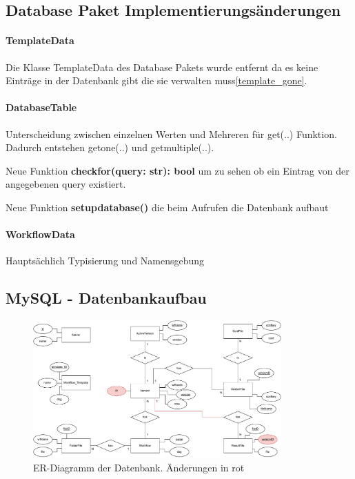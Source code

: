 \subsection{Database Paket Implementierungsänderungen}
\paragraph{TemplateData} Die Klasse TemplateData des Database Pakets wurde entfernt da es keine Einträge in der Datenbank gibt die sie verwalten muss\ref{template_gone}.


\paragraph{DatabaseTable} Unterscheidung zwischen einzelnen Werten und Mehreren für get(..) Funktion. Dadurch entstehen get\textunderscore one(..) und get\textunderscore multiple(..).

Neue Funktion \textbf{check\textunderscore for(query: str): bool} um zu sehen ob ein Eintrag von der angegebenen query existiert.

Neue Funktion \textbf{setup\textunderscore database()} die beim Aufrufen die Datenbank aufbaut

\paragraph{WorkflowData} Hauptsächlich Typisierung und Namensgebung 




\subsection{MySQL - Datenbankaufbau}

\begin{figure}[h]
	\centering
	\includegraphics[width=0.85\textwidth]{res/er_diagram.pdf} 
	\caption{ER-Diagramm der Datenbank. Änderungen in rot}
	\label{fig:er_diagram}
\end{figure}

